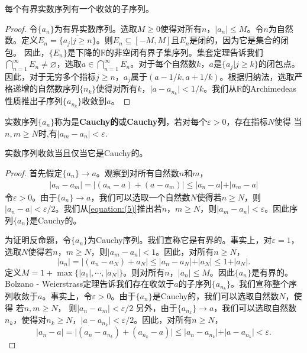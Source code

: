 \documentclass[lang=cn,newtx,10pt,scheme=chinese]{../Template/elegantbook}
\begin{document}
\begin{theorem}\label{theorem:Bolzano - Weierstrass定理1}
  每个有界实数序列有一个收敛的子序列。
\end{theorem}
\begin{proof}
  令\(\{a_n\}\)为有界实数序列。选取\(M\geqslant0\)使得对所有\(n\)，\(\vert a_n\vert\leqslant M\)。令\(n\)为自然数。定义\(E_n=\overline{\{a_j|j\geqslant n\}}\)。则\(E_n\subseteq[-M,M]\)且\(E_n\)是闭的，因为它是集合的闭包。 因此，\(\{E_n\}\)是下降的\(\mathbb{R}\)的非空闭有界子集序列。集套定理告诉我们\(\bigcap_{n = 1}^{\infty}E_n\neq\varnothing\)，选取\(a\in\bigcap_{n = 1}^{\infty}E_n\)。对于每个自然数\(k\)，\(a\)是\(\{a_j|j\geqslant k\}\)的闭包点。 因此，对于无穷多个指标\(j\geqslant n\)，\(a_j\)属于\((a - 1/k,a + 1/k)\)。根据归纳法，选取严格递增的自然数序列\(\{n_k\}\)使得对所有\(k\)，\(\vert a - a_{n_k}\vert<1/k\)。我们从\(\mathbb{R}\)的Archimedeas性质推出子序列\(\{a_{n_k}\}\)收敛到\(a\)。
\end{proof}

\begin{definition}
  实数序列\(\{a_n\}\)称为是\textbf{Cauchy的}或\textbf{Cauchy列}，若对每个\(\varepsilon>0\)，存在指标\(N\)使得
  当\(n,m\geqslant N\)时,有\(\vert a_m - a_n\vert<\varepsilon\).
\end{definition}

\begin{theorem}[实数序列的Cauchy收敛准则]\label{theorem:实数序列的Cauchy收敛准则}
  实数序列收敛当且仅当它是Cauchy的。
\end{theorem}
\begin{proof}
  首先假定\(\{a_n\}\to a\)。观察到对所有自然数\(n\)和\(m\)，
  \begin{align}\label{equation:(5)}
    \vert a_n - a_m\vert=\vert(a_n - a)+(a - a_m)\vert\leqslant\vert a_n - a\vert+\vert a_m - a\vert
  \end{align}
  令\(\varepsilon>0\)。由于\(\{a_n\}\to a\)，我们可以选取一个自然数\(N\)使得若\(n\geqslant N\)，则\(\vert a_n - a\vert<\varepsilon/2\)。我们从\eqref{equation:(5)}推出若\(n\)，\(m\geqslant N\)，则\(\vert a_m - a_n\vert<\varepsilon\)。因此序列\(\{a_n\}\)是Cauchy的。
  
  为证明反命题，令\(\{a_n\}\)为Cauchy序列。我们宣称它是有界的。事实上，对\(\varepsilon = 1\)，选取\(N\)使得若\(n\)，\(m\geqslant N\)，则\(\vert a_m - a_n\vert<1\)。因此，对所有\(n\geqslant N\)，
  \[\vert a_n\vert=\vert(a_n - a_N)+a_N\vert\leqslant\vert a_n - a_N\vert+\vert a_N\vert\leqslant1+\vert a_N\vert.\]
  定义\(M = 1+\max\{\vert a_1\vert, \cdots, \vert a_N\vert\}\)。则对所有\(n\)，\(\vert a_n\vert\leqslant M\)。因此\(\{a_n\}\)是有界的。Bolzano - Weierstrass定理告诉我们存在收敛于\(a\)的子序列\(\{a_{n_k}\}\)。我们宣称整个序列收敛于\(a\)。事实上，令\(\varepsilon>0\)。由于\(\{a_n\}\)是Cauchy的，我们可以选取自然数\(N\)，使得
  若\(n,m\geqslant N\)， 则\(\vert a_n - a_m\vert<\varepsilon/2\)
  另外，由于\(\{a_{n_k}\}\to a\)，我们可以选取自然数\(n_k\)，使得对\(n_k\geqslant N\)，\(\vert a - a_{n_k}\vert<\varepsilon/2\)。因此，对所有\(n\geqslant N\)，
  \[\vert a_n - a\vert=\vert(a_n - a_{n_k})+(a_{n_k}-a)\vert\leqslant\vert a_n - a_{n_k}\vert+\vert a - a_{n_k}\vert<\varepsilon.\]
\end{proof}
\end{document}

